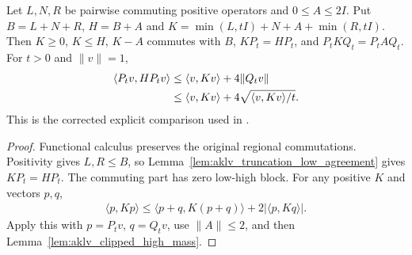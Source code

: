 \begin{lemma}
    \label{lem:aklv_projected_energy}
    \leanok
    Let $L,N,R$ be pairwise commuting positive operators and $0\le A\le2I$.
    Put $B=L+N+R$, $H=B+A$ and
    $K=\min(L,tI)+N+A+\min(R,tI)$. Then $K\ge0$, $K\le H$,
    $K-A$ commutes with $B$, $KP_t=HP_t$, and $P_tKQ_t=P_tAQ_t$.
    For $t>0$ and $\|v\|=1$,
    \begin{align}
        \langle P_tv,HP_tv\rangle
         & \le\langle v,Kv\rangle+4\|Q_tv\|\notag                \\
         & \le\langle v,Kv\rangle+4\sqrt{\langle v,Kv\rangle/t}.
    \end{align}
    This is the corrected explicit comparison used in
    \cite[Lemma~6.5(2)]{Arad2013AreaLaw}.
\end{lemma}
\begin{proof}\leanok
    Functional calculus preserves the original regional commutations.
    Positivity gives $L,R\le B$, so
    Lemma~\ref{lem:aklv_truncation_low_agreement} gives $KP_t=HP_t$.
    The commuting part has zero low-high block. For any positive $K$ and
    vectors $p,q$,
    \begin{align}
        \langle p,Kp\rangle
        \le\langle p+q,K(p+q)\rangle+2|\langle p,Kq\rangle|.
    \end{align}
    Apply this with $p=P_tv$, $q=Q_tv$, use $\|A\|\le2$, and then
    Lemma~\ref{lem:aklv_clipped_high_mass}.
\end{proof}

